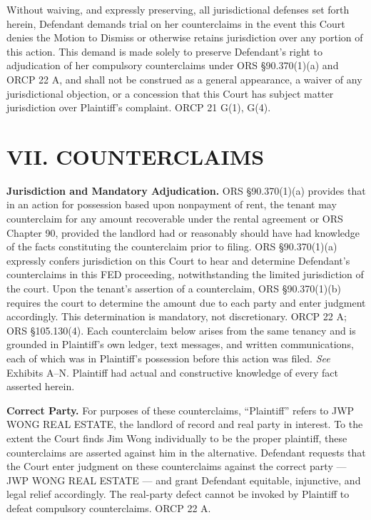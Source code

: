 \documentclass[12pt,letterpaper]{article}
\begin{document}
	Without waiving, and expressly preserving, all jurisdictional defenses set forth herein, Defendant demands trial on her counterclaims in the event this Court denies the Motion to Dismiss or otherwise retains jurisdiction over any portion of this action. This demand is made solely to preserve Defendant's right to adjudication of her compulsory counterclaims under ORS \S90.370(1)(a) and ORCP 22 A, and shall not be construed as a general appearance, a waiver of any jurisdictional objection, or a concession that this Court has subject matter jurisdiction over Plaintiff's complaint. ORCP 21 G(1), G(4).
	
	\section*{VII. COUNTERCLAIMS}
	
	\textbf{Jurisdiction and Mandatory Adjudication.} ORS \S90.370(1)(a) provides that in an action for possession based upon nonpayment of rent, the tenant may counterclaim for any amount recoverable under the rental agreement or ORS Chapter 90, provided the landlord had or reasonably should have had knowledge of the facts constituting the counterclaim prior to filing. ORS \S90.370(1)(a) expressly confers jurisdiction on this Court to hear and determine Defendant's counterclaims in this FED proceeding, notwithstanding the limited jurisdiction of the court. Upon the tenant's assertion of a counterclaim, ORS \S90.370(1)(b) requires the court to determine the amount due to each party and enter judgment accordingly. This determination is mandatory, not discretionary. ORCP 22 A; ORS \S105.130(4). Each counterclaim below arises from the same tenancy and is grounded in Plaintiff's own ledger, text messages, and written communications, each of which was in Plaintiff's possession before this action was filed. \textit{See} Exhibits A--N. Plaintiff had actual and constructive knowledge of every fact asserted herein.
	
	\textbf{Correct Party.} For purposes of these counterclaims, ``Plaintiff'' refers to JWP WONG REAL ESTATE, the landlord of record and real party in interest. To the extent the Court finds Jim Wong individually to be the proper plaintiff, these counterclaims are asserted against him in the alternative. Defendant requests that the Court enter judgment on these counterclaims against the correct party --- JWP WONG REAL ESTATE --- and grant Defendant equitable, injunctive, and legal relief accordingly. The real-party defect cannot be invoked by Plaintiff to defeat compulsory counterclaims. ORCP 22 A.
	
\end{document}
